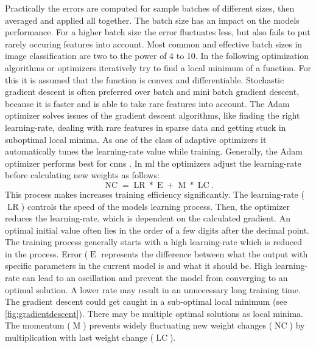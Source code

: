 Practically the errors are computed for sample batches of different sizes, then averaged and applied all together. The batch size has an impact on the models performance. For a higher batch size the error fluctuates less, but also fails to put rarely occuring features into account. Most common and effective batch sizes in image classification are two to the power of 4 to 10. \cite{IbrahemKandel.2020} In the following optimization algorithms or \glspl{optimizer} iteratively try to find a local minimum of a function. For this it is assumed that the function is convex and differentiable. Stochastic gradient descent is often preferred over batch and mini batch gradient descent, because it is faster and is able to take rare features into account. The Adam optimizer solves issues of the gradient descent algorithms, like finding the right \gls{learning-rate}, dealing with rare features in sparse data and getting stuck in suboptimal local minima. As one of the class of adaptive optimizers it automatically tunes the \gls{learning-rate} value while training. Generally, the Adam optimizer performs best for \acrshort{cnn}s \cite{VaniS..2019}. In \acrshort{ml} the optimizers adjust the \gls{learning-rate} before calculating new weights as follows: 
\begin{equation}
    \operatorname{NC} = \operatorname{LR} * \operatorname{E} + \operatorname{M} * \operatorname{LC}.
    \label{eq:nwchange}
\end{equation}
This process makes increases training efficiency significantly. The \gls{learning-rate} (\( \operatorname{LR} \)) controls the speed of the models learning process. Then, the optimizer reduces the \gls{learning-rate}, which is dependent on the calculated gradient. An optimal initial value often lies in the order of a few digits after the decimal point. The training process generally starts with a high \gls{learning-rate} which is reduced in the process. Error (\( \operatorname{E} \) represents the difference between what the output with specific parameters in the current model is and what it should be. \cite{Erb.1993} High \gls{learning-rate} can lead to an oscillation and prevent the model from converging to an optimal solution. A lower rate may result in an unnecessary long training time. The gradient descent could get caught in a sub-optimal local minimum (see \cref{fig:gradientdescent}). There may be multiple optimal solutions as local minima. The momentum (\( \operatorname{M} \)) prevents widely fluctuating new weight changes (\( \operatorname{NC} \)) by multiplication with last weight change (\( \operatorname{LC} \)). \cite{Erb.1993} \cite{Brownlee.2017}

